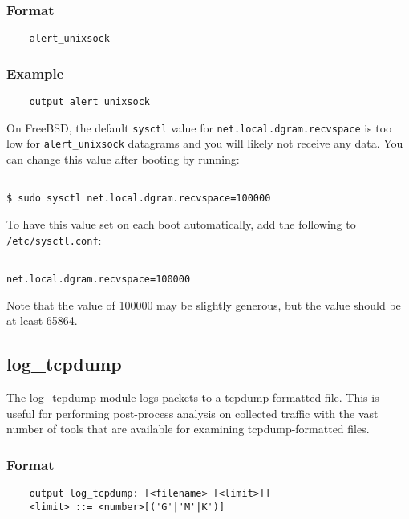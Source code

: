 \documentclass[english]{report}
\newenvironment{note}{
\samepage
    \vspace{10pt}{\textsf{
        {\hspace{7pt}\Huge{$\triangle$\hspace{-12.5pt}{\Large{$^!$}}}}\hspace{5pt}
        {\Large{NOTE}}
    }
    }
   \begin{center}
    \par\vspace{-17pt}

    \begin{lrbox}{\savepar}
    \begin{minipage}[r]{6in}
}
{
    \end{minipage}
    \end{lrbox}
    \fbox{
        \usebox{
            \savepar
	}
    }
    \par\vskip10pt
    \end{center}
}
\newenvironment{note}{
        \begin{rawhtml}
        <p><table border="1"><tr><td><b>
        Note:&nbsp;&nbsp;</b>
        \end{rawhtml}
}{
        \begin{rawhtml}
        </b></td></tr></table></p>
        \end{rawhtml}
}
\begin{document}
\subsubsection{Format}

\begin{verbatim}
    alert_unixsock
\end{verbatim}

\subsubsection{Example}

\begin{verbatim}
    output alert_unixsock
\end{verbatim}

\begin{note}
On FreeBSD, the default \texttt{sysctl} value for \texttt{net.local.dgram.recvspace}
is too low for \texttt{alert\_unixsock} datagrams and you will likely not receive any
data.  You can change this value after booting by running:
\begin{verbatim}

$ sudo sysctl net.local.dgram.recvspace=100000

\end{verbatim}
To have this value set on each boot automatically, add the following to \texttt{/etc/sysctl.conf}:
\begin{verbatim}

net.local.dgram.recvspace=100000

\end{verbatim}
Note that the value of 100000 may be slightly generous, but the value should be at least 65864.
\end{note}

\subsection{log\_tcpdump}

The log\_tcpdump module logs packets to a tcpdump-formatted file.  This is
useful for performing post-process analysis on collected traffic with the vast
number of tools that are available for examining tcpdump-formatted files.

\subsubsection{Format}

\begin{verbatim}
    output log_tcpdump: [<filename> [<limit>]]
    <limit> ::= <number>[('G'|'M'|K')]
\end{verbatim}
\end{document}
